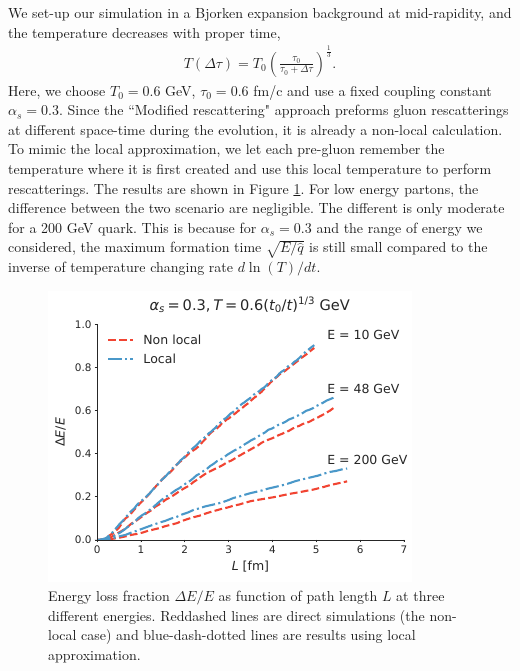 \documentclass[aps, prc, reprint, amsmath, groupedaddress, nofootinbib]{revtex4-1}
\begin{document}
We set-up our simulation in a Bjorken expansion background at mid-rapidity, and the temperature decreases with proper time,
\begin{eqnarray}
T(\Delta\tau) = T_0 \left(\frac{\tau_0}{\tau_0+\Delta\tau}\right)^{\frac{1}{3}}.
\end{eqnarray}
Here, we choose $T_0=0.6$ GeV, $\tau_0=0.6$ fm/c and use a fixed coupling constant $\alpha_s = 0.3$.
Since the ``Modified rescattering" approach preforms gluon rescatterings at different space-time during the evolution, it is already a non-local calculation.
To mimic the local approximation, we let each pre-gluon remember the temperature where it is first created and use this local temperature to perform rescatterings.
The results are shown in Figure \ref{fig:Bjorken}. 
For low energy partons, the difference between the two scenario are negligible. The different is only moderate for a 200 GeV quark.
This is because for $\alpha_s = 0.3$ and the range of energy we considered, the maximum formation time $\sqrt{E/\hat{q}}$ is still small compared to the inverse of temperature changing rate $d\ln(T)/dt$.
\begin{figure}
\includegraphics[width=\columnwidth]{Bjorken.pdf}
\caption{Energy loss fraction $\Delta E /E$ as function of path length $L$ at three different energies. Reddashed lines are direct simulations (the non-local case) and blue-dash-dotted lines are results using local approximation.}
\label{fig:Bjorken}
\end{figure}
\end{document}
